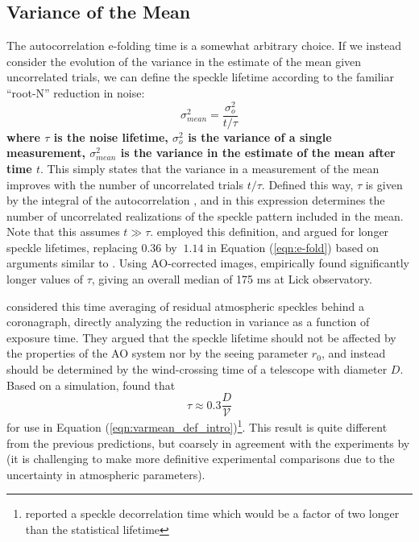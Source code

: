 \documentclass[10pt,preprint]{aastex631}
\begin{document}
\subsection{Variance of the Mean}
The autocorrelation e-folding time is a somewhat arbitrary choice.  If we instead consider the evolution of the variance in the estimate of the mean given uncorrelated trials, we can define the speckle lifetime according to the familiar ``root-N'' reduction in noise:
\begin{equation}
\sigma_{mean}^2 = \frac{\sigma_o^2}{t/\tau}
\label{eqn:varmean_def_intro}
\end{equation}
\textbf{where $\tau$ is the noise lifetime, $\sigma_o^2$ is the variance of a single measurement, $\sigma_{mean}^2$ is the variance in the estimate of the mean after time $t$}.  This simply states that the variance in a measurement of the mean improves with the number of uncorrelated trials $t/\tau$.  Defined this way, $\tau$ is given by the integral of the autocorrelation \citep{2006ApJ...637..541F}, and in this expression determines the number of uncorrelated realizations of the speckle pattern included in the mean.  Note that this assumes $t \gg \tau$.  \citet{1986JOSAA...3.1001A} employed this definition, and argued for longer speckle lifetimes, replacing $0.36$ by $~$$1.14$ in Equation (\ref{eqn:e-fold}) based on arguments similar to \citet{1982JOpt...13..263R}.  Using AO-corrected images, \citet{2006ApJ...637..541F} empirically found significantly longer values of $\tau$, giving an overall median of 175 ms at Lick observatory.  

\citet{2005SPIE.5903..170M} considered this time averaging of residual atmospheric speckles behind a coronagraph, directly analyzing the reduction in variance as a function of exposure time.  They argued that the speckle lifetime should not be affected by the properties of the AO system nor by the seeing parameter $r_0$, and instead should be determined by the wind-crossing time of a telescope with diameter $D$.  Based on a simulation, \citet{2005SPIE.5903..170M} found that 
\begin{equation}
\tau \approx 0.3 \frac{D}{\mathcal{V}}
\end{equation}
for use in Equation (\ref{eqn:varmean_def_intro})\footnote{\citet{2005SPIE.5903..170M} reported a speckle decorrelation time which would be a factor of two longer than the statistical lifetime}.  This result is quite different from the previous predictions, but coarsely in agreement with the experiments by \citet{2006ApJ...637..541F} (it is challenging to make more definitive experimental comparisons due to the uncertainty in atmospheric parameters).
\end{document}
